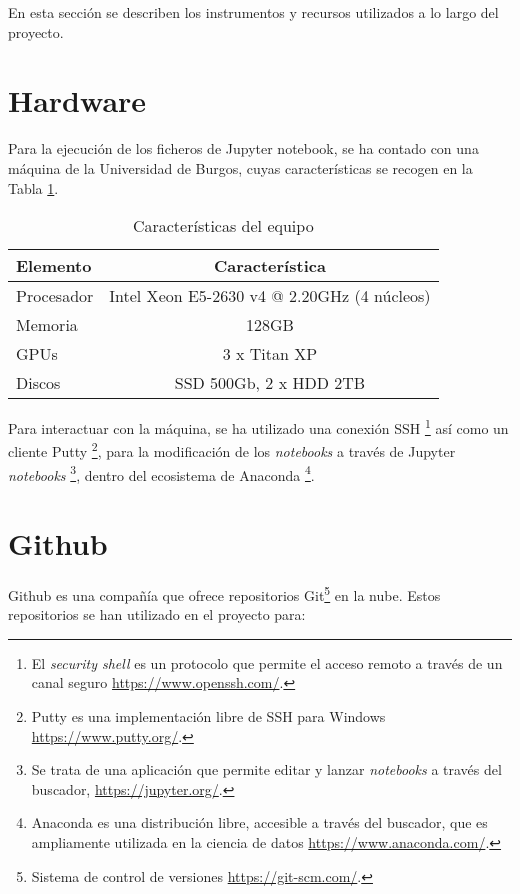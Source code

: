  \label{capitulo4}

En esta sección se describen los instrumentos y recursos utilizados a lo largo del proyecto. 

\section{Hardware} \label{Hardware}

Para la ejecución de los ficheros de Jupyter notebook, se ha contado con una máquina de la Universidad de Burgos, cuyas características se recogen en la Tabla \ref{caracteristicaspc}.

\begin{table}[h!]
\begin{tabular}{l c}
Elemento & Característica \\
\hline
Procesador & Intel Xeon E5-2630 v4 @ 2.20GHz (4 núcleos)\\
Memoria & 128GB\\
GPUs & 3 x Titan XP\\
Discos & SSD 500Gb, 2 x HDD 2TB\\
\end{tabular}
\caption{\label{caracteristicaspc} Características del equipo}
\end{table}

Para interactuar con la máquina, se ha utilizado una conexión SSH \footnote{El \textit{security shell} es un protocolo que permite el acceso remoto a través de un canal seguro \url{https://www.openssh.com/}.} así como un cliente Putty \footnote{Putty es una implementación libre de SSH para Windows \url{https://www.putty.org/}.}, para la modificación de los \textit{notebooks} a través de Jupyter \textit{notebooks} \footnote{Se trata de una aplicación que permite editar y lanzar \textit{notebooks} a través del buscador, \url{https://jupyter.org/}.}, dentro del ecosistema de Anaconda \footnote{Anaconda es una distribución libre, accesible a través del buscador, que es ampliamente utilizada en la ciencia de datos \url{https://www.anaconda.com/}.}.

\section{Github}

Github es una compañía que ofrece repositorios Git\footnote{Sistema de control de versiones \url{https://git-scm.com/}.} en la nube. 
Estos repositorios se han utilizado en el proyecto para:

